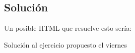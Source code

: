 \documentclass[letterpaper,10pt,spanish]{sphinxmanual}
\begin{document}
\subsection{Solución}
\label{\detokenize{tema2:id2}}
Un posible HTML que resuelve esto sería:

\begin{sphinxVerbatim}[commandchars=\\\{\}]

    Solución al ejercicio propuesto el viernes
     


\end{sphinxVerbatim}
\end{document}
